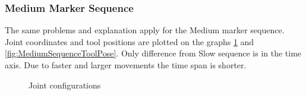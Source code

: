 \documentclass[]{scrartcl}
\begin{document}
\subsubsection*{Medium Marker Sequence}
The same problems and explanation apply for the Medium marker sequence. Joint coordinates and tool positions are plotted on the graphs \ref{fig:MediumSequenceJoints} and \ref{fig:MediumSequenceToolPose}. Only difference from Slow sequence is in the time axis. Due to faster and larger movements the time span is shorter.
\begin{figure}[!htp]
	\hfill
	\caption{Joint configurations}
	\label{fig:MediumSequenceJoints}
\end{figure}
\end{document}
